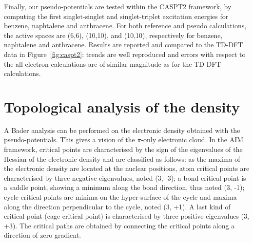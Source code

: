 \documentclass[12pt]{article}
\begin{document}
Finally, our pseudo-potentials are tested within the CASPT2 framework, by computing the first 
singlet-singlet and singlet-triplet excitation energies for benzene, naphtalene and anthracene. 
For both reference and pseudo calculations,
the active spaces are (6,6), (10,10), and (10,10), respectively for benzene, naphtalene and anthracene. 
Results are reported and compared to the TD-DFT data in Figure~\ref{fig:caspt2}: trends 
are well reproduced and errors with respect to the all-electron calculations are of similar magnitude
as for the TD-DFT calculations. 



\section*{\sffamily \large Topological analysis of the density}
A Bader analysis can be performed on the electronic density obtained with the pseudo-potentials.\cite{bader}
This gives a vision of the $\pi$-only electronic cloud.
In the AIM framework, critical points are characterised by the sign of the eigenvalues of the Hessian of 
the electronic density and are classified as follows:
as the maxima of the electronic density are located at the nuclear positions,
atom critical points are characterised by three negative eigenvalues, noted (3, -3);
a bond critical point is a saddle point, showing a minimum along the bond direction,
thus noted (3, -1); cycle critical points are minima on the hyper-surface of the cycle
and maxima along the direction perpendicular to the cycle, noted (3, +1).
A last kind of critical point (cage critical point) is characterised by three positive eigenvalues
(3, +3).
The critical paths are obtained by connecting the critical points along a direction of zero gradient.
\end{document}
